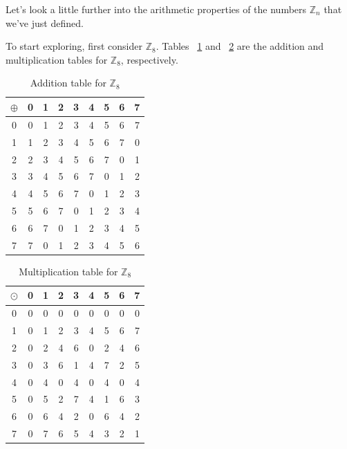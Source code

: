 Let's look a little further into the arithmetic properties of the numbers ${\mathbb Z}_n$ that we've just defined. 


\begin{example}{} 
To start exploring, first consider ${\mathbb Z}_8$. Tables ~\ref{groups_Z8_add_table} and ~\ref{groups_Z8_mult_table} are the addition and multiplication tables for ${\mathbb Z}_8$, respectively.

\begin{table}[h]
\caption{\label{groups_Z8_add_table}Addition table for ${\mathbb Z}_8$}{\small
\begin{center}
\begin{tabular}{c|cccccccc}
$\oplus$ & 0 & 1 & 2 & 3 & 4 & 5 & 6 & 7 \\
\hline
0        & 0 & 1 & 2 & 3 & 4 & 5 & 6 & 7 \\
1       & 1 & 2 & 3 & 4 & 5 & 6 & 7 & 0 \\
2       & 2 & 3 & 4 & 5 & 6 & 7 & 0 & 1\\
3       & 3 & 4 & 5 & 6 & 7 & 0 & 1 & 2\\
4       & 4 & 5 & 6 & 7 & 0 & 1 & 2 & 3\\
5       & 5 & 6 & 7 & 0 & 1 & 2 & 3 & 4\\
6       & 6 & 7 & 0 & 1 & 2 & 3 & 4 & 5\\
7       & 7 & 0 & 1 & 2 & 3 & 4 & 5 & 6\\
\end{tabular}
\end{center}
}
\end{table}

\begin{table}[h]
\caption{\label{groups_Z8_mult_table} Multiplication table for ${\mathbb Z}_8$}{\small
\begin{center}
\begin{tabular}{c|cccccccc}
$\odot$ & 0 & 1 & 2 & 3 & 4 & 5 & 6 & 7 \\
\hline
0       & 0 & 0 & 0 & 0 & 0 & 0 & 0 & 0 \\
1       & 0 & 1 & 2 & 3 & 4 & 5 & 6 & 7 \\
2       & 0 & 2 & 4 & 6 & 0 & 2 & 4 & 6 \\
3       & 0 & 3 & 6 & 1 & 4 & 7 & 2 & 5 \\
4       & 0 & 4 & 0 & 4 & 0 & 4 & 0 & 4 \\
5       & 0 & 5 & 2 & 7 & 4 & 1 & 6 & 3 \\
6       & 0 & 6 & 4 & 2 & 0 & 6 & 4 & 2 \\
7       & 0 & 7 & 6 & 5 & 4 & 3 & 2 & 1
\end{tabular}
\end{center}
}
\end{table}
\end{example}

